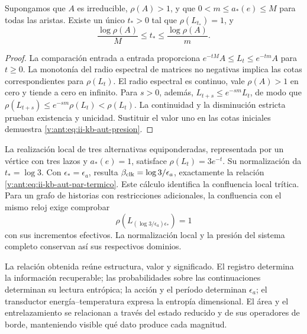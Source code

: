 \begin{proposition}
Supongamos que \(A\) es irreducible, \(\rho(A)>1\), y que
\(0<m\leq a_*(e)\leq M\) para todas las aristas. Existe un único
\(t_*>0\) tal que \(\rho(L_{t_*})=1\), y
\begin{equation}
 \frac{\log\rho(A)}{M}\leq t_*\leq
 \frac{\log\rho(A)}{m}.
 \label{v:ant:eq:ii-kb-aut-presion}
\end{equation}
\end{proposition}
\begin{proof}
La comparación entrada a entrada proporciona
\(e^{-tM}A\leq L_t\leq e^{-tm}A\) para \(t\geq0\).
La monotonía del radio espectral de matrices no negativas implica
las cotas correspondientes para \(\rho(L_t)\). El radio espectral
es continuo, vale \(\rho(A)>1\) en cero y tiende a cero en infinito.
Para \(s>0\), además,
\(L_{t+s}\leq e^{-sm}L_t\), de modo que
\(\rho(L_{t+s})\leq e^{-sm}\rho(L_t)<\rho(L_t)\).
La continuidad y la disminución estricta prueban existencia y
unicidad. Sustituir el valor uno en las cotas iniciales demuestra
\eqref{v:ant:eq:ii-kb-aut-presion}.
\end{proof}

La realización local de tres alternativas equiponderadas, representada
por un vértice con tres lazos y \(a_*(e)=1\), satisface
\(\rho(L_t)=3e^{-t}\). Su normalización da \(t_*=\log3\).
Con \(\epsilon_*=\epsilon_a\), resulta
\(\beta_{\rm clk}=\log3/\epsilon_a\), exactamente la relación
\eqref{v:ant:eq:ii-kb-aut-par-termico}. Este cálculo identifica la
confluencia local trítica. Para un grafo de historias con restricciones
adicionales, la confluencia con el mismo reloj exige comprobar
\[
 \rho\!\left(L_{(\log3/\epsilon_a)\epsilon_*}\right)=1
\]
con sus incrementos efectivos. La normalización local y la presión
del sistema completo conservan así sus respectivos dominios.

La relación obtenida reúne estructura, valor y significado. El registro
determina la información recuperable; las probabilidades sobre las
continuaciones determinan su lectura entrópica; la acción y el período
determinan \(\epsilon_a\); el transductor energía--temperatura
expresa la entropía dimensional. El área y el entrelazamiento se
relacionan a través del estado reducido y de sus operadores de borde,
manteniendo visible qué dato produce cada magnitud.
